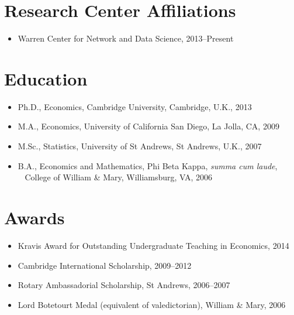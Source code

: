 \documentclass[line,overlapped]{myres}
\begin{document}
\begin{resume}
\section{\sc Research Center Affiliations}
\begin{itemize}
\item Warren Center for Network and Data Science, 2013--Present
\end{itemize}

\section{\sc Education}
\begin{itemize}
\item Ph.D., Economics, Cambridge University, Cambridge, U.K., 2013
\item M.A., Economics, University of California San Diego, La Jolla, CA, 2009
\item M.Sc., Statistics, University of St Andrews, St Andrews, U.K., 2007
\item B.A., Economics and Mathematics, Phi Beta Kappa, \emph{summa cum laude},\\ 
  \-\ \hspace{1em} College of William \& Mary, Williamsburg, VA, 2006
\end{itemize}




\section{\sc Awards}
\vspace{1em}
\begin{itemize}
\item Kravis Award for Outstanding Undergraduate Teaching in Economics, 2014
\item Cambridge International Scholarship, 2009--2012
\item Rotary Ambassadorial Scholarship, St Andrews, 2006--2007
\item Lord Botetourt Medal (equivalent of valedictorian), William \& Mary, 2006
\end{itemize}


\end{resume}
\end{document}
